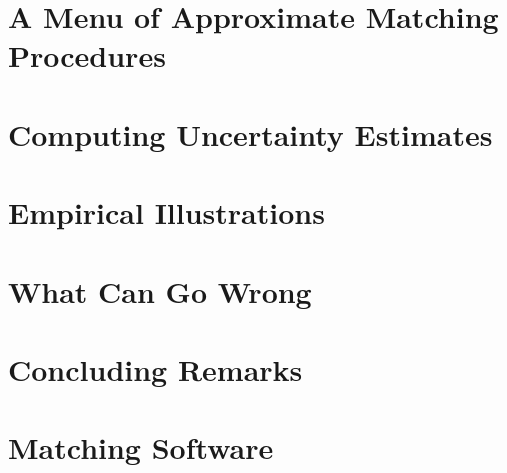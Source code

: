 \documentclass[11pt,titlepage]{article}
\begin{document}
\section{A Menu of Approximate Matching Procedures}

\section{Computing Uncertainty Estimates}

\section{Empirical Illustrations}

\section{What Can Go Wrong}

\section{Concluding Remarks}

\appendix
\section{Matching Software}


 
\end{document}
